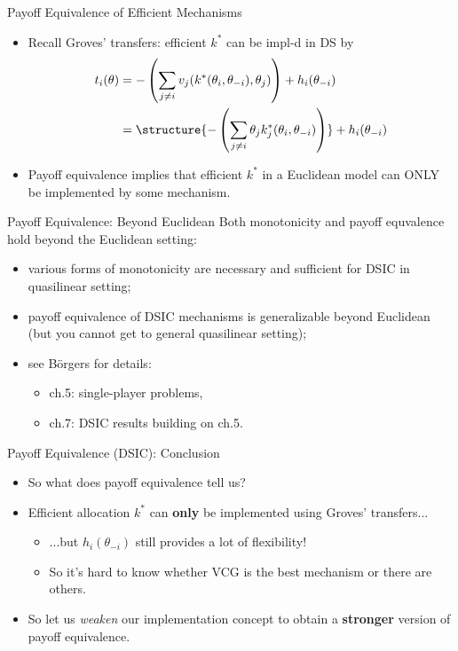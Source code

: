 \documentclass[english,10pt
,aspectratio=169
]{beamer}
\begin{document}
\begin{frame}{Payoff Equivalence of Efficient Mechanisms}
\begin{itemize}
	\item Recall Groves' transfers: efficient $k^*$ can be impl-d in DS by
	\vspace{-0.5em}\begin{align*}
		t_{i}(\theta) &= -\left(\sum_{j\neq i} v_{j}(k^*(\theta_i, \theta_{-i}), \theta_{j}) \right) + h_{i}(\theta_{-i})
		\\ &= \structure{-\left(\sum_{j\neq i} \theta_j k_j^*(\theta_i, \theta_{-i}) \right)} + h_{i}(\theta_{-i})
	\end{align*}
	
	\pause
	\item Payoff equivalence implies that \alert{efficient} $k^*$ in a \alert{Euclidean} model can \alert{ONLY} be implemented by some  mechanism.
\end{itemize}
\end{frame}


\begin{frame}{Payoff Equivalence: Beyond Euclidean}
	Both monotonicity and payoff equvalence hold beyond the Euclidean setting:
	\begin{itemize}
		\item various forms of \alert{monotonicity} are necessary and sufficient for DSIC in quasilinear setting;
		\item \alert{payoff equivalence} of DSIC mechanisms is generalizable beyond Euclidean (but you cannot get to general quasilinear setting);
		\item see B{\"o}rgers for details:
		\begin{itemize}
			\item ch.5: single-player problems,
			\item ch.7: DSIC results building on ch.5.
		\end{itemize}
	\end{itemize}
\end{frame}


\begin{frame}{Payoff Equivalence (DSIC): Conclusion}
	\begin{itemize}
		\item So what does payoff equivalence tell us?
		\item Efficient allocation $k^*$ can \textbf{only} be implemented using Groves' transfers...
		\begin{itemize}
			\item ...but $h_i(\theta_{-i})$ still provides a lot of flexibility!
			\item So it's hard to know whether VCG is the best mechanism or there are others.
		\end{itemize}
		\item So let us \emph{weaken} our implementation concept to obtain a \textbf{stronger} version of payoff equivalence.
	\end{itemize}
\end{frame}
\end{document}
